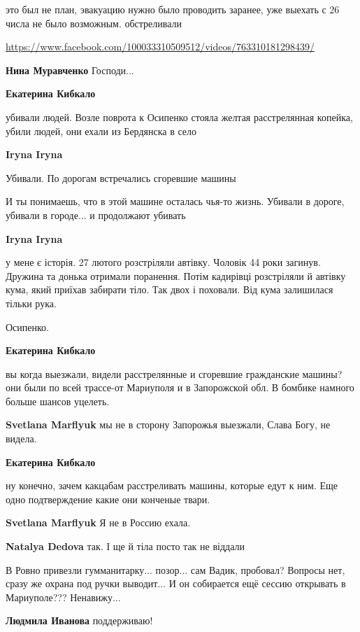 \begin{itemize}

это был не план, эвакуацию нужно было проводить заранее, уже выехать с 26 числа
не было возможным. обстреливали

\url{https://www.facebook.com/100033310509512/videos/763310181298439/}

\textbf{Нина Муравченко} Господи...

\textbf{Екатерина Кибкало} 

убивали людей. Возле поврота к Осипенко стояла желтая расстрелянная копейка,
убили людей, они ехали из Бердянска в село

\textbf{Iryna Iryna} 

Убивали. По дорогам встречались сгоревшие машины

И ты понимаешь, что в этой машине осталась чья-то жизнь. Убивали в дороге,
убивали в городе... и продолжают убивать

\textbf{Iryna Iryna} 

у мене є історія. 27 лютого розстріляли автівку. Чоловік 44 роки загинув.
Дружина та донька отримали поранення. Потім кадирівці розстріляли й автівку
кума, який приїхав забирати тіло. Так двох і поховали. Від кума залишилася
тільки рука.

Осипенко.

\textbf{Екатерина Кибкало} 

вы когда выезжали, видели расстрелянные и сгоревшие гражданские машины? они были
по всей трассе-от Мариуполя и в Запорожской обл. В бомбике намного больше шансов
уцелеть.

\textbf{Svetlana Marflyuk} мы не в сторону Запорожья выезжали, Слава Богу, не видела.

\textbf{Екатерина Кибкало} 

ну конечно, зачем какцабам расстреливать машины, которые едут к ним. Еще одно
подтверждение какие они конченые твари.

\textbf{Svetlana Marflyuk} Я не в Россию ехала.

\textbf{Natalya Dedova} так. І ще й тіла посто так не віддали

\end{itemize} %


В Ровно привезли гумманитарку... позор... сам Вадик, пробовал? Вопросы нет, сразу же
охрана под ручки выводит... И он собирается ещё сессию открывать в
Мариуполе??? Ненавижу...

\begin{itemize} %
\textbf{Людмила Иванова} поддерживаю!
\end{itemize} %
